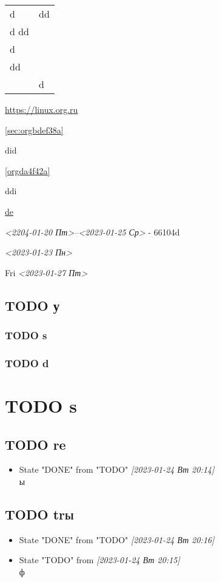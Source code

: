 \documentclass[11pt]{article}
\begin{document}
\begin{center}
\begin{tabular}{ll}
d & dd\\
d dd & \\
d & \\
\hline
  dd & \\
  &
d & \\
\end{tabular}
\end{center}

\url{https://linux.org.ru}

\ref{sec:orgbdef38a}

\label{orgda4f42a}
\label{org193ee75}did

\ref{orgda4f42a}

ddi

\href{https://linux.org.ru}{de}

\textit{<2204-01-20 Пт>--<2023-01-25 Ср> } - 66104d


\textit{<2023-01-23 Пн>}

Fri
\textit{<2023-01-27 Пт>}

\subsection{{\bfseries\sffamily TODO} у}
\label{sec:org3940b67}
\subsubsection{{\bfseries\sffamily TODO} s}
\label{sec:org9c013c6}
\subsubsection{{\bfseries\sffamily TODO} d}
\label{sec:org7dee919}

\section{{\bfseries\sffamily TODO} s}
\label{sec:orgca4a469}
\subsection{{\bfseries\sffamily TODO} re}
\label{sec:orgb16672b}
\begin{itemize}
\item State "DONE"       from "TODO"       \textit{[2023-01-24 Вт 20:14] } \\
ы
\end{itemize}
\subsection{{\bfseries\sffamily TODO} tr\hfill{}\textsc{ы}}
\label{sec:org6e514e4}
\begin{itemize}
\item State "DONE"       from "TODO"       \textit{[2023-01-24 Вт 20:16]}
\item State "TODO"       from              \textit{[2023-01-24 Вт 20:15] } \\
ф
\end{itemize}
\end{document}
